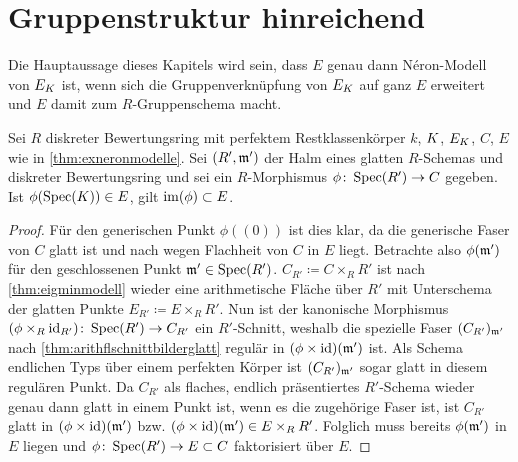 
  
\section{Gruppenstruktur hinreichend}\label{chap:gruppenstrukturhinreichend}
Die Hauptaussage dieses Kapitels wird sein, dass $E$ genau dann
Néron-Modell von $E_{K}$ ist, wenn sich die Gruppenverknüpfung von
$E_{K}$ auf ganz $E$ erweitert und $E$ damit zum $R$-Gruppenschema
macht.
\begin{Lemma}\label{thm:schnittearithmflglatt}
  Sei $R$ diskreter Bewertungsring mit perfektem Restklassenkörper
  $k$, $K$, $E_{K}$, $C$, $E$ wie in \ref{thm:exneronmodelle}.
  Sei $(R',\mathfrak{m}')$ der Halm eines glatten $R$-Schemas und diskreter
  Bewertungsring
  und sei ein $R$-Morphismus $\phi\colon \operatorname{Spec}(R')\to C$ gegeben.
  Ist $\phi(\operatorname{Spec}(K))\in E$, gilt $\operatorname{im}(\phi)\subset E$.
  \begin{proof}
    Für den generischen Punkt $\phi((0))$ ist dies klar, da die
    generische Faser von $C$ glatt ist und nach
    \cite[8.5, Proposition 17]{bosch} wegen Flachheit von $C$ in $E$
    liegt. 
    Betrachte also $\phi(\mathfrak{m}')$ für den geschlossenen Punkt
    $\mathfrak{m}'\in\operatorname{Spec}(R')$.
    $C_{R'}\coloneqq C\times_R R'$ ist nach
    \ref{thm:eigminmodell} wieder eine arithmetische Fläche über
    $R'$ mit Unterschema der glatten Punkte
    $E_{R'}\coloneqq E\times_R R'$.
    Nun ist der kanonische Morphismus
    $(\phi\times_{R}\mathrm{id}_{R'})\colon\operatorname{Spec}(R')\to C_{R'}$ ein 
    $R'$-Schnitt, weshalb die spezielle Faser $(C_{R'})_{\mathfrak{m}'}$ nach
    \ref{thm:arithflschnittbilderglatt} regulär in
    $(\phi\times\mathrm{id})(\mathfrak{m}')$ ist.
    Als Schema endlichen Typs über einem
    perfekten Körper ist $(C_{R'})_{\mathfrak{m}'}$ sogar glatt in diesem
    regulären Punkt.
    Da $C_{R'}$ als flaches, endlich präsentiertes $R'$-Schema wieder
    genau dann glatt in einem Punkt ist, wenn es die zugehörige Faser
    ist, ist $C_{R'}$ glatt in $(\phi\times\mathrm{id})(\mathfrak{m}')$ bzw.
    $(\phi\times\mathrm{id})(\mathfrak{m}')\in E\times_R R'$. Folglich muss bereits
    $\phi(\mathfrak{m}')$ in $E$ liegen und $\phi\colon \operatorname{Spec}(R')\to E\subset C$
    faktorisiert über $E$.
  \end{proof}
\end{Lemma}  

